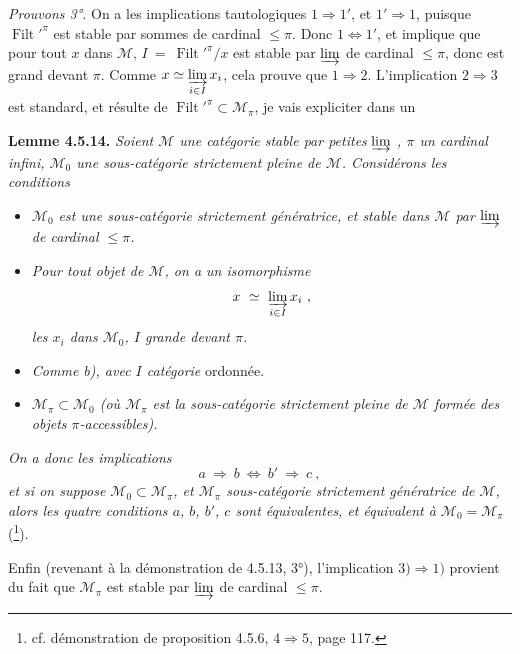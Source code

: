 \documentclass[11pt]{article}
\newcommand{\printedpage}[1]{\if\relax\detokenize{#1}\relax\else\marginpar{\footnotesize p.~#1}\fi}
\newcommand{\msp}[1]{\marginpar{\footnotesize [#1]}}
\newcommand{\Filt}{\operatorname{Filt}}
\begin{document}
\textit{Prouvons 3°.} On a les implications tautologiques $1 \Longrightarrow 1'$, et $1' \Longrightarrow 1$, puisque $\Filt'^{\pi}$ est stable par sommes de cardinal $\leqslant \pi$. Donc $1 \Longleftrightarrow 1'$, et implique que pour tout $x$ dans $\mathcal{M}$,
\msp{page 133}
$I \ = \ \Filt'^{\pi}/x$ est stable par $\varinjlim$ de cardinal $\leqslant \pi$, donc est grand devant $\pi$. Comme $x \simeq \varinjlim\limits_{i\in I} x_i$, cela prouve que $1 \Longrightarrow 2$. L'implication $2 \Longrightarrow 3$ est standard, et résulte de $\Filt'^{\pi} \subset \mathcal{M}_{\pi}$, je vais expliciter dans un

\textbf{Lemme 4.5.14.} \textit{Soient $\mathcal{M}$ une catégorie stable par petites} $\varinjlim$ \textit{, $\pi$ un cardinal infini, $\mathcal{M}_0$ une sous-catégorie strictement pleine de $\mathcal{M}$. Considérons les conditions}
\begin{itemize}
\item[\textit{a)}] \textit{$\mathcal{M}_0$ est une sous-catégorie strictement génératrice, et stable dans $\mathcal{M}$ par} $\varinjlim$ \textit{de cardinal $\leqslant \pi$.}
\item[\textit{b)}] \textit{Pour tout objet de $\mathcal{M}$, on a un isomorphisme}
\[ x \ \simeq \ \varinjlim_{i\in I} x_i \ , \]
\textit{les $x_i$ dans $\mathcal{M}_0$, $I$ grande devant $\pi$.}

\printedpage{42}
\item[\textit{b$'$)}] \textit{Comme b), avec $I$ catégorie} ordonnée.
\item[\textit{c)}] \textit{$\mathcal{M}_{\pi} \subset \mathcal{M}_0$ (où $\mathcal{M}_{\pi}$ est la sous-catégorie strictement pleine de $\mathcal{M}$ formée des objets $\pi$-accessibles).}
\end{itemize}
\textit{On a donc les implications}
\[ a \ \Longrightarrow \ b \ \Longleftrightarrow \ b' \ \Longrightarrow \ c \ , \]
\textit{et si on suppose $\mathcal{M}_0 \subset \mathcal{M}_{\pi}$, et $\mathcal{M}_{\pi}$ sous-catégorie strictement génératrice de $\mathcal{M}$, alors les quatre conditions $a$, $b$, $b'$, $c$ sont équivalentes, et équivalent à $\mathcal{M}_0 = \mathcal{M}_{\pi}$} (\footnote{cf. démonstration de proposition 4.5.6, $4 \Longrightarrow 5$, page 117.}).

\msp{page 134}
Enfin (revenant à la démonstration de 4.5.13, 3°), l'implication $3) \Longrightarrow 1)$ provient du fait que $\mathcal{M}_{\pi}$ est stable par $\varinjlim$ de cardinal $\leqslant \pi$.
\end{document}
